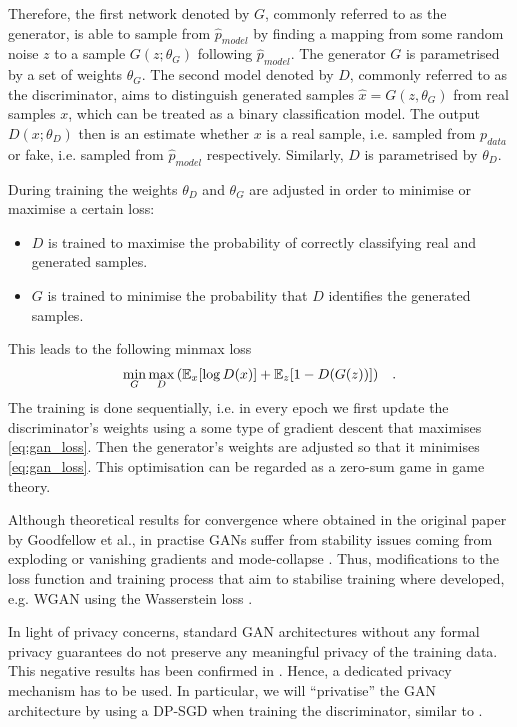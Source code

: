Therefore, the first network denoted by $G$, commonly referred to as the generator, is able to sample from $\hat{p}_{model}$ by finding a mapping from some random noise $z$ to a sample $G(z; \theta_G)$ following $\hat{p}_{model}$. The generator $G$ is parametrised by a set of weights $\theta_G$. The second model denoted by $D$, commonly referred to as the discriminator, aims to distinguish generated samples $\hat{x}= G(z,\theta_G)$ from real samples $x$, which can be treated as a binary classification model. The output $D(x; \theta_D)$ then is an estimate whether $x$ is a real sample, i.e. sampled from $p_{data}$ or fake, i.e. sampled from $\hat{p}_{model}$ respectively. Similarly, $D$ is parametrised by $\theta_D$.

During training the weights $\theta_D$ and $\theta_G$ are adjusted in order to minimise or maximise a certain loss:
\begin{itemize}
    \item $D$ is trained to maximise the probability of correctly classifying real and generated samples.
    \item $G$ is trained to minimise the probability that $D$ identifies the generated samples.
\end{itemize}

This leads to the following minmax loss
\begin{align} \label{eq:gan_loss}
    \min_G \max_D \left(\mathbb{E}_x[\log D(x)] + \mathbb{E}_z[1-D(G(z))]\right) \;\;\;.
\end{align}
The training is done sequentially, i.e. in every epoch we first update the discriminator's weights using a some type of gradient descent that maximises  \cref{eq:gan_loss}. Then the generator's weights are adjusted so that it minimises \cref{eq:gan_loss}. This optimisation can be regarded as a zero-sum game in game theory. 

Although theoretical results for convergence where obtained in the original paper by Goodfellow et al., in practise GANs suffer from stability issues coming from exploding or vanishing gradients and mode-collapse \parencite[see][for in-depth review]{gui2020review,jabbar2020survey}. Thus, modifications to the loss function and training process that aim to stabilise training where developed, e.g. WGAN using the Wasserstein loss \parencite{arjovsky2017wasserstein}.

In light of privacy concerns, standard GAN architectures without any formal privacy guarantees do not preserve any meaningful privacy of the training data. This negative results has been confirmed in \parencite{lin2021privacy,stadler2022synthetic}. Hence, a dedicated privacy mechanism has to be used. In particular, we will ``privatise'' the GAN architecture by using a DP-SGD when training the discriminator, similar to \parencite{xie2018differentially}.

